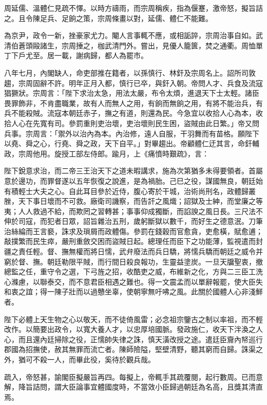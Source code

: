\begin{pinyinscope}
周延儒、溫體仁見疏不懌。以時方禱雨，而宗周稱疾，指為偃蹇，激帝怒，擬旨詰之。且令陳足兵、足餉之策，宗周條畫以對，延儒、體仁不能難。

為京尹，政令一新，挫豪家尤力。閹人言事輒不應，或相詬誶，宗周治事自如。武清伯蒼頭毆諸生，宗周捶之，枷武清門外。嘗出，見優人籠篋，焚之通衢。周恤單丁下戶尤至。居一載，謝病歸，都人為罷市。

八年七月，內閣缺人，命吏部推在籍者，以孫慎行、林釬及宗周名上。詔所司敦趨，宗周固辭不許。明年正月入都，慎行已卒，與釬入朝。帝問人才、兵食及流寇猖獗狀。宗周言：「陛下求治太急，用法太嚴，布令太煩，進退天下士太輕。諸臣畏罪飾非，不肯盡職業，故有人而無人之用，有餉而無餉之用，有將不能治兵，有兵不能殺賊。流寇本朝廷赤子，撫之有道，則還為民。今急宜以收拾人心為本，收拾人心在先寬有司。參罰重則吏治壞，吏治壞則民生困，盜賊由此日繁。」帝又問兵事。宗周言：「禦外以治內為本。內治修，遠人自服，干羽舞而有苗格。願陛下以堯、舜之心，行堯、舜之政，天下自平。」對畢趨出。帝顧體仁迂其言，命釬輔政，宗周他用。旋授工部左侍郎。踰月，上《痛憤時艱疏》，言：

陛下銳意求治，而二帝三王治天下之道未暇講求，施為次第猶多未得要領者。首屬意於邊功，而罪督遂以五年恢復之說進，是為禍胎。己巳之役，謀國無良，朝廷始有積輕士大夫之心。自此耳目參於近侍，腹心寄於干城，治術尚刑名，政體歸叢脞，天下事日壞而不可救。廠衛司譏察，而告訐之風熾；詔獄及士紳，而堂廉之等夷；人人救過不給，而欺罔之習轉甚；事事仰成獨斷，而諂諛之風日長。三尺法不伸於司寇，而犯者日眾，詔旨雜治五刑，歲躬斷獄以數千，而好生之德意泯。刀筆治絲綸而王言褻，誅求及瑣屑而政體傷。參罰在錢穀而官愈貪，吏愈橫，賦愈逋；敲撲繁而民生瘁，嚴刑重斂交困而盜賊日起。總理任而臣下之功能薄，監視遣而封疆之責任輕。督、撫無權而將日懦，武弁廢法而兵日驕，將懦兵驕而朝廷之威令并窮於督、撫。朝廷勒限平賊，而行間日殺良報功，生靈益塗炭。一旦天牖聖衷，撤總監之任，重守令之選，下弓旌之招，收酷吏之威，布維新之化，方與二三臣工洗心滌慮，以聯泰交，而不意君臣相遇之難也。得一文震孟而以單辭報罷，使大臣失和衷之誼；得一陳子壯而以過戇坐辜，使朝寧無吁咈之風。此關於國體人心非淺鮮者。

陛下必體上天生物之心以敬天，而不徒倚風雷；必念祖宗鑒古之制以率祖，而不輕改作。以簡要出政令，以寬大養人才，以忠厚培國脈。發政施仁，收天下泮渙之人心，而且還內廷掃除之役，正懦帥失律之誅，慎天潢改授之途。遣廷臣齎內帑巡行郡國為招撫使，赦其無罪而流亡者。陳師險隘，堅壁清野，聽其窮而自歸。誅渠之外，猶可不殺一人，而畢此役，奚待於觀兵哉。

疏入，帝怒甚，諭閣臣擬嚴旨再四。每擬上，帝輒手其疏覆閱，起行數周。已而意解，降旨詰問，謂大臣論事宜體國度時，不當效小臣歸過朝廷為名高，且獎其清直焉。


\end{pinyinscope}
